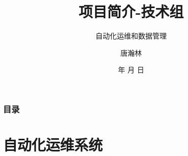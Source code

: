 \documentclass{beamer}
\begin{document}
\title{项目简介-技术组}
\subtitle{自动化运维和数据管理}

\author{唐瀚林}


\renewcommand{\today}{\number\year 年 \number\month 月 \number\day 日}
\date{\today}

\subject{Presentations}

\begin{frame}
\titlepage
\end{frame}

\begin{frame}
\frametitle{目录}
\tableofcontents%
\end{frame}

\section{自动化运维系统}
\end{document}

